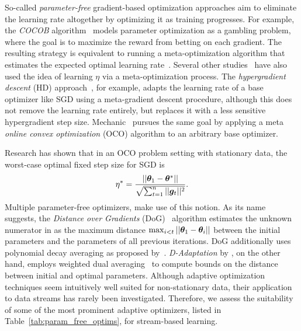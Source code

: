 \documentclass{article} %
\begin{document}

So-called \textit{parameter-free} gradient-based optimization approaches aim to eliminate the learning rate altogether by optimizing it as training progresses.
For example, the \textit{COCOB} algorithm~\citep{orabonaTrainingDeepNetworks2017} models parameter optimization as a gambling problem, where the goal is to maximize the reward from betting on each gradient.
The resulting strategy is equivalent to running a meta-optimization algorithm that estimates the expected optimal learning rate~\citep{orabonaTrainingDeepNetworks2017}.
Several other studies~\citep{vanervenMetaGradMultipleLearning2016a,baydinOnlineLearningRate2018,cutkoskyMechanicLearningRate2023} have also used the idea of learning $\eta$ via a meta-optimization process.
The \textit{hypergradient descent} (HD) approach~\citep{baydinOnlineLearningRate2018}, for example, adapts the learning rate of a base optimizer like SGD using a meta-gradient descent procedure, although this does not remove the learning rate entirely, but replaces it with a less sensitive hypergradient step size.
Mechanic~\citep{cutkoskyMechanicLearningRate2023} pursues the same goal by applying a meta \textit{online convex optimization} (OCO) algorithm to an arbitrary base optimizer.

Research has shown that in an OCO problem setting with stationary data, the worst-case optimal fixed step size for SGD is
\begin{equation}\label{eq:oco_optimal_lr}
   \eta^* = \frac{||{\bm{\theta}}_1 - {\bm{\theta}}^*||}{\sqrt{\sum_{t=1}^{n} ||{\bm{g}}_t||^2}}.
\end{equation}
Multiple parameter-free optimizers, make use of this notion.
As its name suggests, the \textit{Distance over Gradients} (DoG)~\citep{ivgiDoGSGDBest2023} algorithm estimates the unknown numerator in  as the maximum distance $\max_{i<t}||{\bm{\theta}}_1 - {\bm{\theta}}_i||$ between the initial parameters and the parameters of all previous iterations.
DoG additionally uses polynomial decay averaging as proposed by~\citet{shamirStochasticGradientDescent2012}.
\textit{D-Adaptation} by \citet{defazioLearningRateFreeLearningDAdaptation2023a}, on the other hand, employs weighted dual averaging~\citep{duchiDualAveragingDistributed2012} to compute bounds on the distance between initial and optimal parameters.
Although adaptive optimization techniques seem intuitively well suited for non-stationary data, their application to data streams has rarely been investigated.
Therefore, we assess the suitability of some of the most prominent adaptive optimizers, listed in Table~\ref{tab:param_free_optims}, for stream-based learning.
\end{document}

